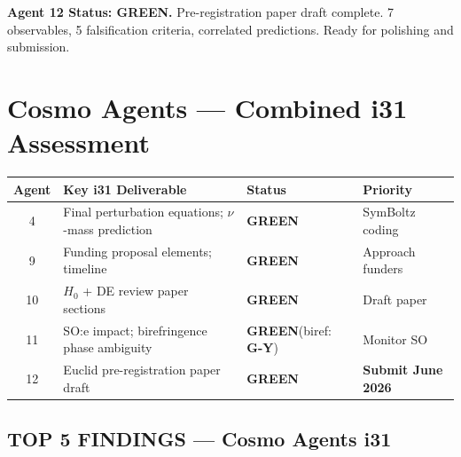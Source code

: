 \documentclass[11pt,a4paper]{article}
\newcommand{\GREEN}{\textcolor{dfdgreen}{\textbf{GREEN}}}
\newcommand{\GY}{\textcolor{dfdgy}{\textbf{G-Y}}}
\begin{document}
\textbf{Agent 12 Status: \GREEN.} Pre-registration paper draft complete. 7 observables, 5 falsification criteria, correlated predictions. Ready for polishing and submission.

\section{Cosmo Agents --- Combined i31 Assessment}

\begin{center}
\begin{tabular}{clll}
\toprule
\textbf{Agent} & \textbf{Key i31 Deliverable} & \textbf{Status} & \textbf{Priority} \\
\midrule
4 & Final perturbation equations; $\nu$-mass prediction & \GREEN & SymBoltz coding \\
9 & Funding proposal elements; timeline & \GREEN & Approach funders \\
10 & $H_0$ + DE review paper sections & \GREEN & Draft paper \\
11 & SO:e impact; birefringence phase ambiguity & \GREEN (biref: \GY) & Monitor SO \\
12 & Euclid pre-registration paper draft & \GREEN & \textbf{Submit June 2026} \\
\bottomrule
\end{tabular}
\end{center}

\subsection{TOP 5 FINDINGS --- Cosmo Agents i31}
\end{document}
